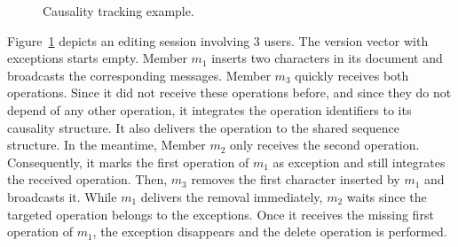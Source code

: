 



\begin{figure}
  \centering
  
  \caption{\label{fig:timeline} Causality tracking example.}
\end{figure}

Figure~\ref{fig:timeline} depicts an editing session involving 3 users. The
version vector with exceptions starts empty. Member $m_1$ inserts two characters
in its document and broadcasts the corresponding messages. Member $m_3$ quickly
receives both operations. Since it did not receive these operations before, and
since they do not depend of any other operation, it integrates the operation
identifiers to its causality structure. It also delivers the operation to the
shared sequence structure. In the meantime, Member $m_2$ only receives the
second operation. Consequently, it marks the first operation of $m_1$ as
exception and still integrates the received operation. Then, $m_3$ removes the
first character inserted by $m_1$ and broadcasts it. While $m_1$ delivers the
removal immediately, $m_2$ waits since the targeted operation belongs to the
exceptions. Once it receives the missing first operation of $m_1$, the exception
disappears and the delete operation is performed.

